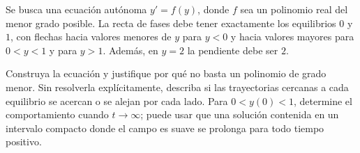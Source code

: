 Se busca una ecuación autónoma \(y'=f(y)\), donde \(f\) sea un polinomio real del menor grado posible. La recta de fases debe tener exactamente los equilibrios \(0\) y \(1\), con flechas hacia valores menores de \(y\) para \(y<0\) y hacia valores mayores para \(0<y<1\) y para \(y>1\). Además, en \(y=2\) la pendiente debe ser \(2\).

Construya la ecuación y justifique por qué no basta un polinomio de grado menor. Sin resolverla explícitamente, describa si las trayectorias cercanas a cada equilibrio se acercan o se alejan por cada lado. Para \(0<y(0)<1\), determine el comportamiento cuando \(t\to\infty\); puede usar que una solución contenida en un intervalo compacto donde el campo es suave se prolonga para todo tiempo positivo.
